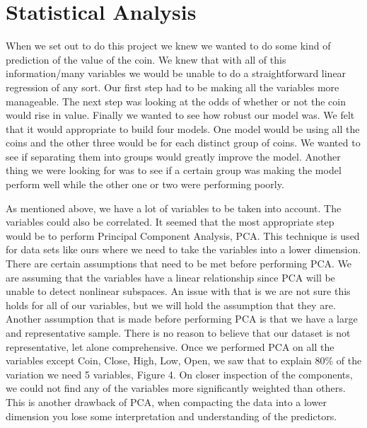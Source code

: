 \documentclass[12pt]{article}
\begin{document}
\section{Statistical Analysis}

\indent  \indent When we set out to do this project we knew we wanted to do some kind of prediction of the value of the coin. We knew that with all of this information/many variables we would be unable to do a straightforward linear regression of any sort. Our first step had to be making all the variables more manageable. The next step was looking at the odds of whether or not the coin would rise in value. Finally we wanted to see how robust our model was. We felt that it would appropriate to build four models. One model would be using all the coins and the other three would be for each distinct group of coins. We wanted to see if separating them into groups would greatly improve the model. Another thing we were looking for was to see if a certain group was making the model perform well while the other one or two were performing poorly.

\indent As mentioned above, we have a lot of variables to be taken into account. The variables could also be correlated. It seemed that the most appropriate step would be to perform Principal Component Analysis, PCA. This technique is used for data sets like ours where we need to take the variables into a lower dimension. There are certain assumptions that need to be met before performing PCA. We are assuming that the variables have a linear relationship since PCA will be unable to detect nonlinear subspaces. An issue with that is we are not sure this holds for all of our variables, but we will hold the assumption that they are. Another assumption that is made before performing PCA is that we have a large and representative sample. There is no reason to believe that our dataset is not representative, let alone comprehensive. Once we performed PCA on all the variables except Coin, Close, High, Low, Open, we saw that to explain 80\% of the variation we need 5 variables, Figure 4. On closer inspection of the components, we could not find any of the variables more significantly weighted than others. This is another drawback of PCA, when compacting the data into a lower dimension you lose some interpretation and understanding of the predictors.
\end{document}
